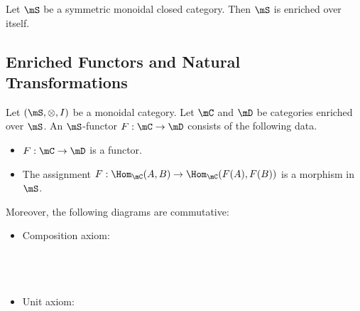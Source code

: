 \documentclass[a4paper]{article}
\begin{document}
\begin{prp}{}{} Let $\mS$ be a symmetric monoidal closed category. Then $\mS$ is enriched over itself. 
\end{prp}

\subsection{Enriched Functors and Natural Transformations}
\begin{defn}{}{} Let $(\mS,\otimes,I)$ be a monoidal category. Let $\mC$ and $\mD$ be categories enriched over $\mS$. An $\mS$-functor $F:\mC\to\mD$ consists of the following data. 
\begin{itemize}
\item $F:\mC\to\mD$ is a functor. 
\item The assignment $F:\Hom_\mC(A,B)\to\Hom_\mC(F(A),F(B))$ is a morphism in $\mS$. 
\end{itemize}
Moreover, the following diagrams are commutative: 
\begin{itemize}
\item Composition axiom: \\~\\
\\~\\
\item Unit axiom: \\~\\
\\~\\
\end{itemize}
\end{defn}
\end{document}
